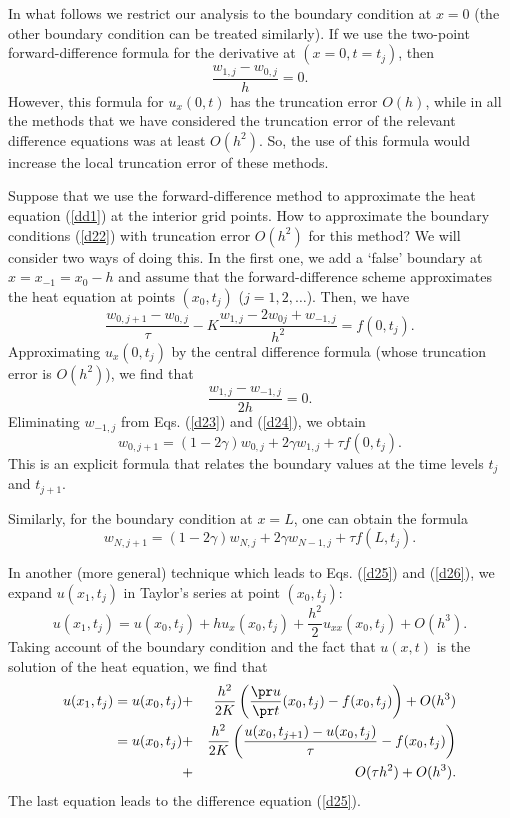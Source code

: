 In what follows we restrict our analysis to the boundary condition at $x=0$
(the other boundary condition can be treated similarly).
If we use the two-point forward-difference formula for the derivative
at $(x=0, t=t_{j})$, then
\[
\frac{w_{1,j}-w_{0,j}}{h}=0 .
\]
However, this formula for $u_{x}(0,t)$ has the truncation error $O(h)$,
while in all the methods that we have considered the truncation error
of the relevant difference equations was
at least $O(h^2)$. So, the use of this formula would increase the local
truncation error of these methods.

  
 
Suppose that we use the forward-difference method
to approximate the heat equation (\ref{dd1}) at the interior grid points.
How to approximate the boundary conditions (\ref{d22})
with truncation error $O(h^2)$ for this method?
We will consider two ways of doing this.
In the first one, we add a `false' boundary at
$x=x_{-1}=x_{0}-h$ and assume that the forward-difference scheme
approximates the heat equation at points $(x_{0},t_{j})$ ($j=1,2,\dots$). Then,
we have
\begin{equation}
\frac{w_{0,j+1}-w_{0,j}}{\tau}-K
\frac{w_{1, j}-2w_{0j}+w_{-1,j}}{h^{2}}=f(0,t_j). \label{d23}
\end{equation}
Approximating $u_{x}({0},t_{j})$ by the central difference formula
(whose truncation error is $O(h^2)$), we find that
\begin{equation}
\frac{w_{1,j}-w_{-1,j}}{2h}=0. \label{d24}
\end{equation}
Eliminating $w_{-1,j}$ from Eqs. (\ref{d23}) and (\ref{d24}), we obtain
\begin{equation}
w_{0,j+1}=(1-2\gamma)w_{0,j}+2\gamma w_{1,j}+\tau f(0,t_j). \label{d25}
\end{equation}
This is an explicit formula that relates the boundary values at the time levels
$t_{j}$ and $t_{j+1}$.

  
 
Similarly, for the boundary condition at $x=L$, one can obtain the formula
\begin{equation}
w_{N,j+1}=(1-2\gamma)w_{N,j}+2\gamma w_{N-1,j}+\tau f(L,t_j). \label{d26}
\end{equation}

  
 
In another (more general) technique which leads to Eqs. (\ref{d25}) and
(\ref{d26}), we expand $u(x_{1},t_{j})$ in Taylor's series at point
$(x_{0},t_{j})$:
\[
u(x_{1},t_{j})=u(x_{0},t_{j})+h u_{x}(x_0,t_j)+
\frac{h^2}{2}u_{xx}(x_0,t_j)+O(h^3).
\]
Taking account of the boundary condition and the fact that $u(x,t)$ is
the solution of the heat equation, we find that
\begin{eqnarray}
u(x_{1},t_{j})=u(x_{0},t_{j})&+&
\frac{h^2}{2K}\left(\frac{\pr u}{\pr t}(x_0,t_j)-
f(x_0,t_j)\right)+O(h^3) \nonumber \\
= u(x_{0},t_{j})&+&
\frac{h^2}{2K}\left(\frac{u(x_0,t_{j+1})-u(x_0,t_{j})}{\tau}-
f(x_0,t_j)\right)\nonumber\\
&+&O(\tau h^2)+O(h^3). \nonumber
\end{eqnarray}
The last equation leads to the difference equation (\ref{d25}).
 

